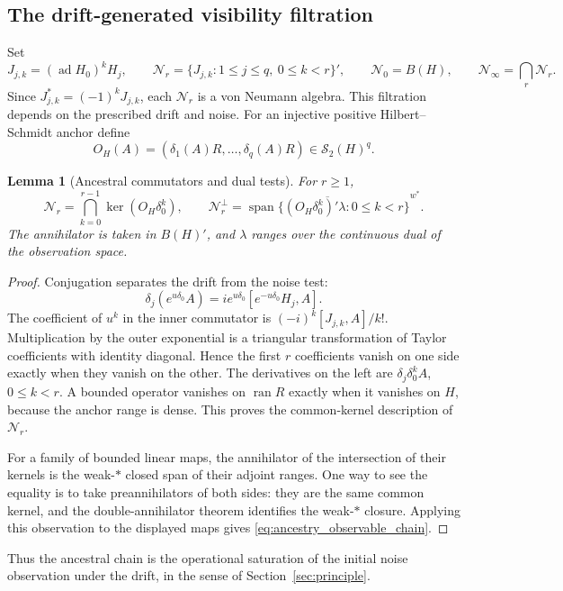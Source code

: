 \documentclass[11pt,a4paper]{amsart}
\numberwithin{equation}{section}
\newtheorem{lemma}[theorem]{Lemma}
\theoremstyle{definition}
\theoremstyle{remark}
\newcommand{\Sch}{\mathcal S}
\DeclareMathOperator{\ran}{ran}
\DeclareMathOperator{\Span}{span}
\DeclareMathOperator{\ad}{ad}
\begin{document}
\subsection{The drift-generated visibility filtration}
Set
\begin{equation}\label{eq:time_ancestors}
 J_{j,k}=(\ad H_0)^kH_j,\qquad
 \mathcal N_r=\{J_{j,k}:1\le j\le q,\ 0\le k<r\}',\qquad
 \mathcal N_0=B(H),\qquad \mathcal N_\infty=\bigcap_r\mathcal N_r.
\end{equation}
Since $J_{j,k}^*=(-1)^kJ_{j,k}$, each $\mathcal N_r$ is a von Neumann algebra. This filtration depends on the prescribed drift and noise. For an injective positive Hilbert--Schmidt anchor define
\[
 O_H(A)=(\delta_1(A)R,\ldots,\delta_q(A)R)\in\Sch_2(H)^q.
\]
\begin{lemma}[Ancestral commutators and dual tests]\label{lem:ancestry_dual_chain}
For $r\ge1$,
\begin{equation}\label{eq:ancestry_observable_chain}
 \mathcal N_r=\bigcap_{k=0}^{r-1}\ker(O_H\delta_0^k),\qquad
 \mathcal N_r^\perp=
 \overline{\Span\{(O_H\delta_0^k)'\lambda:0\le k<r\}}^{w^*}.
\end{equation}
The annihilator is taken in $B(H)'$, and $\lambda$ ranges over the continuous dual of the observation space.
\end{lemma}
\begin{proof}
Conjugation separates the drift from the noise test:
\begin{equation}\label{eq:ancestry_conjugation}
 \delta_j(e^{u\delta_0}A)
 =i e^{u\delta_0}[e^{-u\delta_0}H_j,A].
\end{equation}
The coefficient of $u^k$ in the inner commutator is
$(-i)^k[J_{j,k},A]/k!$. Multiplication by the outer exponential is a triangular transformation of Taylor coefficients with identity diagonal. Hence the first $r$ coefficients vanish on one side exactly when they vanish on the other. The derivatives on the left are $\delta_j\delta_0^kA$, $0\le k<r$. A bounded operator vanishes on $\ran R$ exactly when it vanishes on $H$, because the anchor range is dense. This proves the common-kernel description of $\mathcal N_r$.

For a family of bounded linear maps, the annihilator of the intersection of their kernels is the weak-$*$ closed span of their adjoint ranges. One way to see the equality is to take preannihilators of both sides: they are the same common kernel, and the double-annihilator theorem identifies the weak-$*$ closure. Applying this observation to the displayed maps gives \eqref{eq:ancestry_observable_chain}.
\end{proof}
Thus the ancestral chain is the operational saturation of the initial noise observation under the drift, in the sense of Section~\ref{sec:principle}.
\end{document}
